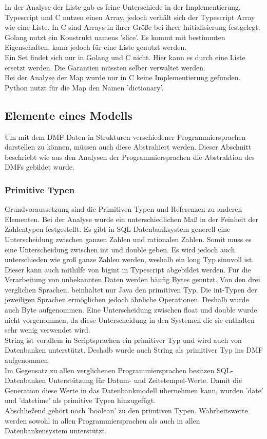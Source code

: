 \documentclass[./einleitung.tex]{subfiles}
\begin{document}
In der Analyse der Liste gab es feine Unterschiede in der Implementierung. Typescript und C nutzen einen Array, jedoch verhält sich der Typescript Array wie eine Liste. In C sind Arrays in ihrer Größe bei ihrer Initialisierung festgelegt. Golang nutzt ein Konstrukt namens 'slice'. Es kommt mit bestimmten Eigenschaften, kann jedoch für eine Liste genutzt werden. \\

Ein Set findet sich nur in Golang und C nicht. Hier kann es durch eine Liste ersetzt werden. Die Garantien müssten selber verwaltet werden. \\

Bei der Analyse der Map wurde nur in C keine Implementierung gefunden. Python nutzt für die Map den Namen 'dictionary'.





\subsection{Elemente eines Modells}
Um mit dem DMF Daten in Strukturen verschiedener Programmiersprachen darstellen zu können, müssen auch diese Abstrahiert werden. Dieser Abschnitt beschriebt wie aus den Analysen der Programmiersprachen die Abstraktion des DMFs gebildet wurde.

\subsubsection{Primitive Typen}
Grundvoraussetzung sind die Primitiven Typen und Referenzen zu anderen Elementen.
Bei der Analyse wurde ein unterschiedlichen Maß in der Feinheit der Zahlentypen festgestellt.
Es gibt in SQL Datenbanksystem generell eine Unterscheidung zwischen ganzen Zahlen und rationalen Zahlen. Somit muss es eine Unterscheidung zwischen int und double geben. 
Es wird jedoch auch unterschieden wie groß ganze Zahlen werden, weshalb ein long Typ sinnvoll ist. Dieser kann auch mithilfe von bigint in Typescript abgebildet werden.
Für die Verarbeitung von unbekannten Daten werden häufig Bytes genutzt. Von den drei verglichen Sprachen, beinhaltet nur Java den primitiven Typ. Die int-Typen der jeweiligen Sprachen ermöglichen jedoch ähnliche Operationen. Deshalb wurde auch Byte aufgenommen.
Eine Unterscheidung zwischen float und double wurde nicht vorgenommen, da diese Unterscheidung in den Systemen die sie enthalten sehr wenig verwendet wird.\\
String ist vorallem in Scriptsprachen ein primitiver Typ und wird auch von Datenbanken unterstützt. Deshalb wurde auch String als primitiver Typ ins DMF aufgenommen. \\
Im Gegensatz zu allen verglichenen Programmiersprachen besitzen SQL-Datenbanken Unterstützung für Datum- und Zeitstempel-Werte. Damit die Generation diese Werte in das Datenbankmodell übernehmen kann, wurden 'date' und 'datetime' als primitive Typen hinzugefügt. \\
Abschließend gehört noch 'boolean' zu den primtiven Typen. Wahrheitswerte werden sowohl in allen Programmiersprachen als auch in allen Datenbankensystem unterstützt. \\
\end{document}

